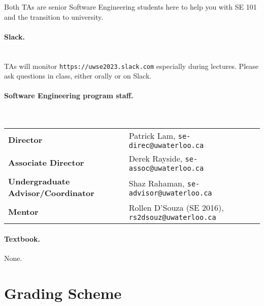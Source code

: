 \documentclass[11pt,onecolumn]{article}
\begin{document}
\noindent Both TAs are senior Software Engineering students here to help you with SE 101
and the transition to university.

\paragraph{Slack.}~\\[1em]
TAs will monitor {\tt https://uwse2023.slack.com} especially during lectures.
Please ask questions in class, either orally or on Slack.

\paragraph{Software Engineering program staff.}~\\[1em]
\begin{tabular}{ll}
  {\bf Director} & Patrick Lam, {\tt se-direc@uwaterloo.ca} \\
  {\bf Associate Director} & Derek Rayside, {\tt se-assoc@uwaterloo.ca} \\
  {\bf Undergraduate Advisor/Coordinator} & Shaz Rahaman, {\tt se-advisor@uwaterloo.ca} \\
  {\bf Mentor} & Rollen D'Souza (SE 2016), {\tt rs2dsouz@uwaterloo.ca}
\end{tabular}

\paragraph{Textbook.} None.


\section{Grading Scheme}
\end{document}
